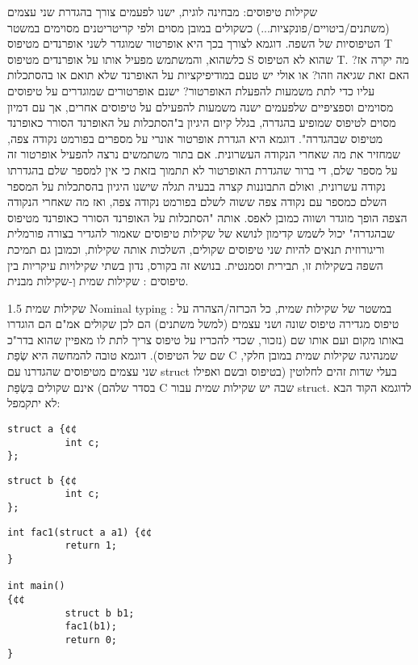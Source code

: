 \begin{טבלא}[!htbp]
      שקילות טיפוסים:
      מבחינה לוגית, ישנו לפעמים צורך בהגדרת שני עצמים (משתנים/ביטויים/פונקציות...)
      כשקולים במובן מסוים ולפי קריטריטנים מסוימים במשטר הטיפוסיות של השפה. דוגמא
      לצורך בכך היא אופרטור שמוגדר לשני אופרנדים מטיפוס T כלשהוא, והמשתמש מפעיל אותו
      על אופרנדים מטיפוס S שהוא לא הטיפוס T. מה יקרה אז? האם זאת שגיאה וזהו? או אולי
      יש טעם במודיפיקציות על האופרנד שלא תואם או בהסתכלות עליו כדי לתת משמעות להפעלת
      האופרטור? ישנם אופרטורים שמוגדרים על טיפוסים מסוימים וספציפיים שלפעמים ישנה
      משמעות להפעילם על טיפוסים אחרים, אך עם דמיון מסוים לטיפוס שמופיע בהגדרה, בגלל
      קיום היגיון ב"הסתכלות על האופרנד הסורר כאופרנד מטיפוס שבהגדרה". דוגמא היא הגדרת
      אופרטור אונרי על מספרים בפורמט נקודה צפה, שמחזיר את מה שאחרי הנקודה העשרונית.
      אם בתור משתמשים נרצה להפעיל אופרטור זה על מספר שלם, די ברור שהגדרת האופרטור לא
      תתמוך בזאת כי אין למספר שלם בהגדרתו נקודה עשרונית, ואולם התבוננות קצרה בבעיה
      תגלה שישנו היגיון בהסתכלות על המספר השלם כמספר עם נקודה צפה ששוה לשלם בפורמט
      נקודה צפה, ואז מה שאחרי הנקודה הצפה הופך מוגדר ושווה כמובן לאפס. אותה "הסתכלות
      על האופרנד הסורר כאופרנד מטיפוס שבהגדרה" יכול לשמש קדימון לנושא של שקילות
      טיפוסים שאמור להגדיר בצורה פורמלית וריגורוזית תנאים להיות שני טיפוסים שקולים,
      השלכות אותה שקילות, וכמובן גם תמיכת השפה בשקילות זו, תבירית וסמנטית. בנושא זה
      בקורס, נדון בשתי שקילויות עיקריות בין טיפוסים : שקילות שמית וְ-שקילות מבנית.

      1.5 שקילות שמית Nominal typing :
      במשטר של שקילות שמית, כל הכרזה/הצהרה על טיפוס מגדירה טיפוס שונה ושני עצמים
      (למשל משתנים) הם לכן שקולים אמ"ם הם הוגדרו באותו מקום ועם אותו שם (נזכור, שכדי
      להכריז על טיפוס צריך לתת לו מאפיין שהוא בדר"כ שם של הטיפוס). דוגמא טובה להמחשה
      היא שְׂפַת C שמנהיגה שקילות שמית במובן חלקי, שני עצמים מטיפוסים שהגדרנו עם struct
      בעלי שדות זהים לחלוטין (בטיפוס ובשם ואפילו בסדר שלהם) אינם שקולים בִּשְׂפַת C שבה יש
      שקילות שמית עבור struct. לדוגמא הקוד הבא לא יתקמפל:

\begin{verbatim}
struct a {¢¢
          int c;
};
\end{verbatim}

\begin{verbatim}
struct b {¢¢
          int c;
};
\end{verbatim}

\begin{verbatim}
int fac1(struct a a1) {¢¢
          return 1;
}

int main()
{¢¢
          struct b b1;
          fac1(b1);
          return 0;
}
\end{verbatim}


\end{טבלא}
